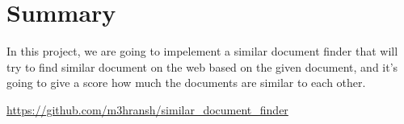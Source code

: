\section*{Summary}
In this project, we are going to impelement a similar document finder
that will try to find similar document on the web based on the given document,
and it's going to give a score how much the documents are similar to each other.

\href{https://github.com/m3hransh/similar_document_finder}{https://github.com/m3hransh/similar_document_finder}